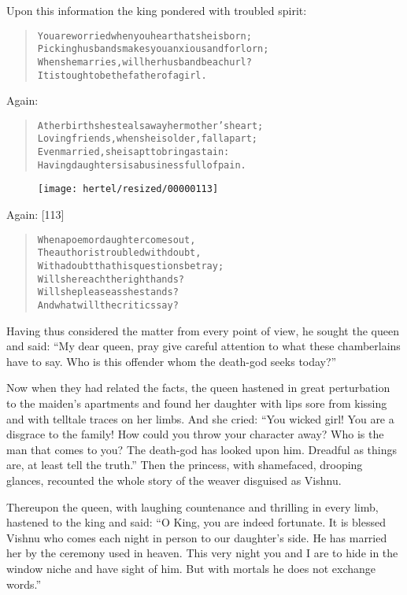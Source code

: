 \documentclass[article, twoside, 10pt]{memoir}
\renewenvironment{verbatim}{%
\begin{quote}%
\vskip -10pt%
\begin{alltt}\normalfont\small}{\end{alltt}%
\end{quote}%
\vskip -10pt
} %
\begin{document}
Upon this information the king pondered with troubled spirit:

\begin{verbatim}
You are worried when you hear that she is born;
Picking husbands makes you anxious and forlorn;
When she marries, will her husband be a churl?
It is tough to be the father of a girl.
\end{verbatim}
Again:

\begin{verbatim}
At her birth she steals away her mother's heart;
Loving friends, when she is older, fall apart;
Even married, she is apt to bring a stain:
Having daughters is a business full of pain.
\end{verbatim}
\begin{figure}[p]\texttt{[image: hertel/resized/00000113]}\end{figure}Again: [113]

\begin{verbatim}
When a poem or daughter comes out,
The author is troubled with doubt,
    With a doubt that his questions betray;
Will she reach the right hands?
Will she please as she stands?
    And what will the critics say?
\end{verbatim}
Having thus considered the matter from every point of view, he
sought the queen and said:
``My dear queen, pray give careful attention to what these chamberlains have to say. Who is this offender whom the death-god seeks today?''

Now when they had related the facts, the queen hastened in great
perturbation to the maiden's apartments and found her daughter with
lips sore from kissing and with telltale traces on her limbs. And
she cried:
``You wicked girl! You are a disgrace to the family! How could you throw your character away? Who is the man that comes to you? The death-god has looked upon him. Dreadful as things are, at least tell the truth.''
Then the princess, with shamefaced, drooping glances, recounted the
whole story of the weaver disguised as Vishnu.

Thereupon the queen, with laughing countenance and thrilling in
every limb, hastened to the king and said:
``O King, you are indeed fortunate. It is blessed Vishnu who comes each night in person to our daughter's side. He has married her by the ceremony used in heaven. This very night you and I are to hide in the window niche and have sight of him. But with mortals he does not exchange words.''
\end{document}
